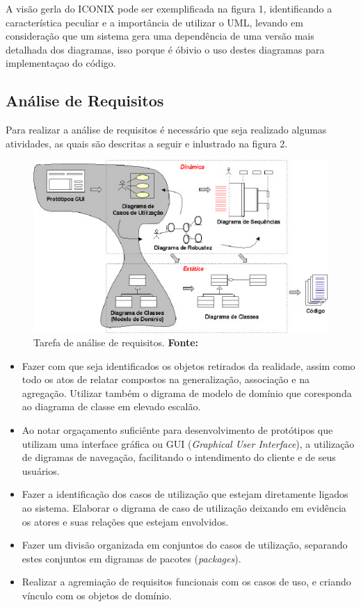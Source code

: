 \par A visão gerla do ICONIX pode ser exemplificada na figura 1, identificando a
característica peculiar e a importância de utilizar o UML, levando em
consideração que um sistema gera uma dependência de uma versão mais detalhada
dos diagramas, isso porque é óbivio o uso destes diagramas para implementaçao do
código.

\subsection{Análise de Requisitos}

\par Para realizar a análise de requisitos é necessário que seja realizado
algumas atividades, as quais são descritas a seguir e inlustrado na figura 2.

\begin{figure}[h!]
  \centerline{\includegraphics[scale=1.2]{./imagens/iconix2.png}}
  \caption[Tarefa de análise de requisitos]
          {Tarefa de análise de requisitos. \textbf{Fonte:}
          \cite{UML_Silva_Videira}}
\label{fig:exemplo1}
\end{figure}

\begin{itemize}
  \item Fazer com que seja identificados os objetos retirados da realidade,
  assim como todo os atos de relatar compostos na generalização, associação e na
  agregação. Utilizar também o digrama de modelo de domínio que coresponda ao
  diagrama de classe em elevado escalão.
  \item Ao notar orgaçamento suficiênte para desenvolvimento de protótipos que
  utilizam uma interface gráfica ou GUI (\textit{Graphical User   Interface}), 
  a utilização de digramas de navegação, facilitando o intendimento
  do cliente e de seus usuários.
  \item Fazer a identificação dos casos de utilização que estejam diretamente
  ligados ao sistema. Elaborar o digrama de caso de utilização deixando em
  evidência os atores e suas relações que estejam envolvidos.
  \item Fazer um divisão organizada em conjuntos do casos de utilização,
  separando estes conjuntos em digramas de pacotes (\textit{packages}).
  \item Realizar a agremiação de requisitos funcionais com os casos de uso, e
  criando vínculo com os objetos de domínio.
\end{itemize}

